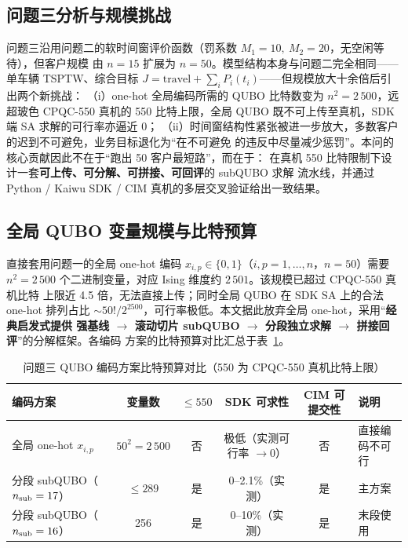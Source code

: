 \documentclass[UTF8,12pt,a4paper]{ctexart}
\begin{document}
\subsection{问题三分析与规模挑战}

问题三沿用问题二的软时间窗评价函数（罚系数 $M_1=10,\ M_2=20$，无空闲等待），但客户规模
由 $n=15$ 扩展为 $n=50$。模型结构本身与问题二完全相同——单车辆 TSPTW、综合目标
$J=\mathrm{travel}+\sum_i P_i(t_i)$——但规模放大十余倍后引出两个新挑战：
（i）one-hot 全局编码所需的 QUBO 比特数变为 $n^{2}=2\,500$，远超玻色 CPQC-550 真机的
550 比特上限，全局 QUBO 既不可上传至真机，SDK 端 SA 求解的可行率亦逼近 0；
（ii）时间窗结构性紧张被进一步放大，多数客户的迟到不可避免，业务目标退化为``在不可避免
的违反中尽量减少惩罚''。本问的核心贡献因此不在于``跑出 50 客户最短路''，而在于：
在真机 550 比特限制下设计一套\textbf{可上传、可分解、可拼接、可回评}的 subQUBO 求解
流水线，并通过 Python / Kaiwu SDK / CIM 真机的多层交叉验证给出一致结果。

\subsection{全局 QUBO 变量规模与比特预算}
\label{subsec:q3-budget}

直接套用问题一的全局 one-hot 编码 $x_{i,p}\in\{0,1\}$（$i,p=1,\dots,n$，$n=50$）需要
$n^{2}=2\,500$ 个二进制变量，对应 Ising 维度约 $2\,501$。该规模已超过 CPQC-550 真机比特
上限近 4.5 倍，无法直接上传；同时全局 QUBO 在 SDK SA 上的合法 one-hot 排列占比
$\sim 50!/2^{2500}$，可行率极低。本文据此放弃全局 one-hot，采用``\textbf{经典启发式提供
强基线 $\to$ 滚动切片 subQUBO $\to$ 分段独立求解 $\to$ 拼接回评}''的分解框架。各编码
方案的比特预算对比汇总于表~\ref{tab:q3-budget}。

\begin{table}[H]
  \centering
  \caption{问题三 QUBO 编码方案比特预算对比（550 为 CPQC-550 真机比特上限）}
  \label{tab:q3-budget}
  \footnotesize
  \begin{tabular}{lccccl}
    \toprule
    编码方案 & 变量数 & $\le 550$ & SDK 可求性 & CIM 可提交性 & 说明 \\
    \midrule
    全局 one-hot $x_{i,p}$              & $50^{2}=2\,500$ & 否 & 极低（实测可行率 $\to 0$） & 否    & 直接编码不可行 \\
    分段 subQUBO（$n_{\rm sub}=17$）     & $\le 289$       & 是 & 0--2.1\%（实测）           & 是    & 主方案 \\
    分段 subQUBO（$n_{\rm sub}=16$）     & 256             & 是 & 0--10\%（实测）            & 是    & 末段使用 \\
    \bottomrule
  \end{tabular}
\end{table}
\end{document}
